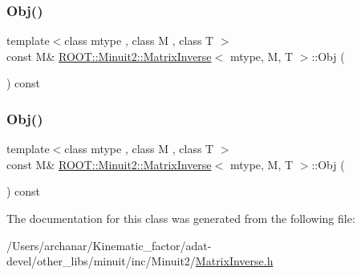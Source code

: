 \subsubsection{\texorpdfstring{Obj()}{Obj()}\hspace{0.1cm}{\footnotesize\ttfamily [2/3]}}
{\footnotesize\ttfamily template$<$class mtype , class M , class T $>$ \\
const M\& \mbox{\hyperlink{classROOT_1_1Minuit2_1_1MatrixInverse}{R\+O\+O\+T\+::\+Minuit2\+::\+Matrix\+Inverse}}$<$ mtype, M, T $>$\+::Obj (\begin{DoxyParamCaption}{ }\end{DoxyParamCaption}) const\hspace{0.3cm}{\ttfamily [inline]}}

\mbox{\label{classROOT_1_1Minuit2_1_1MatrixInverse_a189a8ae3c36a989a47758de7aee4e181}} 
\subsubsection{\texorpdfstring{Obj()}{Obj()}\hspace{0.1cm}{\footnotesize\ttfamily [3/3]}}
{\footnotesize\ttfamily template$<$class mtype , class M , class T $>$ \\
const M\& \mbox{\hyperlink{classROOT_1_1Minuit2_1_1MatrixInverse}{R\+O\+O\+T\+::\+Minuit2\+::\+Matrix\+Inverse}}$<$ mtype, M, T $>$\+::Obj (\begin{DoxyParamCaption}{ }\end{DoxyParamCaption}) const\hspace{0.3cm}{\ttfamily [inline]}}



The documentation for this class was generated from the following file\+:\begin{DoxyCompactItemize}
\item 
/\+Users/archanar/\+Kinematic\+\_\+factor/adat-\/devel/other\+\_\+libs/minuit/inc/\+Minuit2/\mbox{\hyperlink{adat-devel_2other__libs_2minuit_2inc_2Minuit2_2MatrixInverse_8h}{Matrix\+Inverse.\+h}}\end{DoxyCompactItemize}
